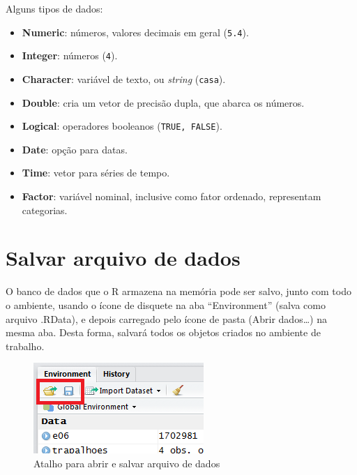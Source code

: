 \documentclass[12pt,brazil,oneside]{book}
\providecommand{\tightlist}{%
  \setlength{\itemsep}{0pt}\setlength{\parskip}{0pt}}
\begin{document}
Alguns tipos de dados:

\begin{itemize}
\tightlist
\item
  \textbf{Numeric}: números, valores decimais em geral (\texttt{5.4}).
\item
  \textbf{Integer}: números (\texttt{4}).
\item
  \textbf{Character}: variável de texto, ou \emph{string}
  (\texttt{casa}).
\item
  \textbf{Double}: cria um vetor de precisão dupla, que abarca os
  números.
\item
  \textbf{Logical}: operadores booleanos (\texttt{TRUE,\ FALSE}).
\item
  \textbf{Date}: opção para datas.
\item
  \textbf{Time}: vetor para séries de tempo.
\item
  \textbf{Factor}: variável nominal, inclusive como fator ordenado,
  representam categorias.
\end{itemize}

\hypertarget{salvar-arquivo-de-dados}{%
\section{Salvar arquivo de dados}\label{salvar-arquivo-de-dados}}

O banco de dados que o R armazena na memória pode ser salvo, junto com
todo o ambiente, usando o ícone de disquete na aba ``Environment''
(salva como arquivo .RData), e depois carregado pelo ícone de pasta
(Abrir dados\ldots{}) na mesma aba. Desta forma, salvará todos os
objetos criados no ambiente de trabalho.

\begin{figure}[H]

{\centering \includegraphics[width=0.8\linewidth]{r6} 

}

\caption{Atalho para abrir e salvar arquivo de dados}\label{fig:r6}
\end{figure}
\end{document}
